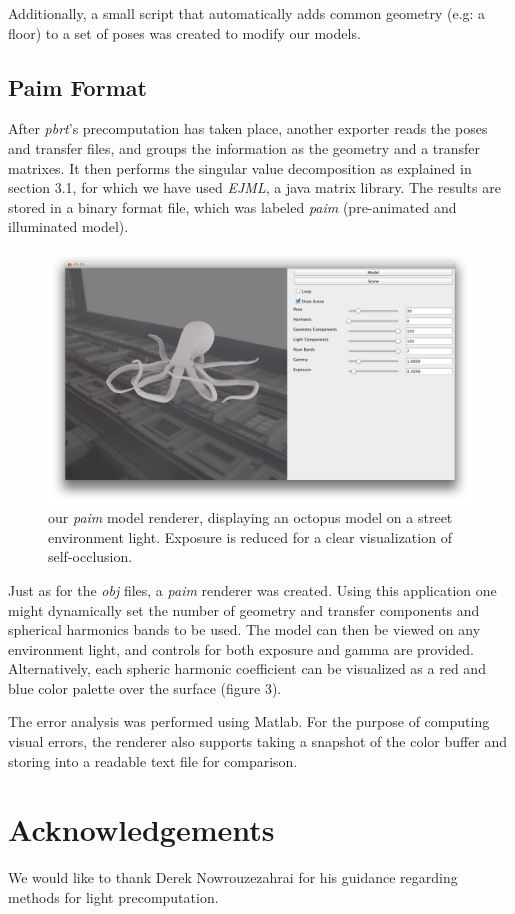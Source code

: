 \documentclass[annual]{acmsiggraph}
\begin{document}
Additionally, a small script that automatically adds common geometry (e.g: a floor) to a set of poses was created to modify our models.

\subsection{Paim Format}
After \emph{pbrt}'s precomputation has taken place, another exporter reads the poses and transfer files, and groups the information as the geometry and a transfer matrixes. It then performs the singular value decomposition as explained in section 3.1, for which we have used \emph{EJML}, a java matrix library. The results are stored in a binary format file, which was labeled \emph{paim} (pre-animated and illuminated model).

\begin{figure}[p]
  \centering
  \includegraphics[width=7in]{images/renderer.png}
  \parbox{7in} {
  \caption{our \emph{paim} model renderer, displaying an octopus model on a street environment light. Exposure is reduced for a clear visualization of self-occlusion.}}
\end{figure}

Just as for the \emph{obj} files, a \emph{paim} renderer was created. Using this application one might dynamically set the number of geometry and transfer components and spherical harmonics bands to be used. The model can then be viewed on any environment light, and controls for both exposure and gamma are provided. Alternatively, each spheric harmonic coefficient can be visualized as a red and blue color palette over the surface (figure 3).

The error analysis was performed using Matlab. For the purpose of computing visual errors, the renderer also supports taking a snapshot of the color buffer and storing into a readable text file for comparison.

\section{Acknowledgements}

We would like to thank Derek Nowrouzezahrai for his guidance regarding methods for light precomputation.



\end{document}
